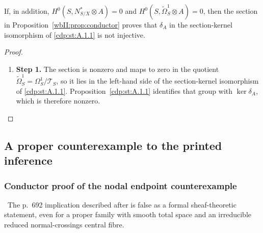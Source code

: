 \begin{corollary}
\hypertarget{tag-03DU}{}\label{wbII:cor:normal-crossing-kernel}

If, in addition, $H^0(S,N^*_{S/X}\otimes A)=0$ and
$H^0(S,\widetilde\Omega^1_S\otimes A)=0$, then the section in
Proposition~\ref{wbII:prop:conductor} proves that $\delta_A$ in
the section-kernel isomorphism of \cref{cdp:st:A.1.1} is not injective.
\end{corollary}



\begin{proof}
\begin{enumerate}[label={$\langle1\rangle$\arabic*.},leftmargin=*]
\item 
\noindent\textbf{Step 1.} The section is nonzero and maps to zero in the quotient
$\widetilde\Omega^1_S=\Omega^1_S/\mathscr T_S$, so it
lies in the left-hand side of the section-kernel isomorphism of \cref{cdp:st:A.1.1}.  Proposition~\ref{cdp:st:A.1.1}
identifies that group with $\ker\delta_A$, which is therefore nonzero.

\end{enumerate}
\end{proof}



\subsection{A proper counterexample to the printed inference}

\subsubsection*{Conductor proof of the nodal endpoint counterexample}

\ The p.~692 implication described after  is false as a formal
sheaf-theoretic statement, even for a proper family with smooth total space
and an irreducible reduced normal-crossings central fibre.



